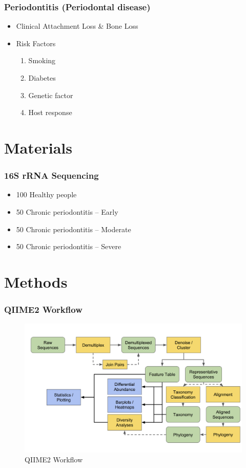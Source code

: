 \documentclass{beamer}
\begin{document}
    \begin{frame}
        \frametitle{Periodontitis (Periodontal disease)}

        \begin{itemize}
            \item Clinical Attachment Loss \& Bone Loss \cite{periodontitis1}
            \item Risk Factors \cite{periodontitis2}
            \begin{enumerate}
                \item Smoking
                \item Diabetes
                \item Genetic factor
                \item Host response
            \end{enumerate}
        \end{itemize}
    \end{frame}

    \section{Materials}
    \begin{frame}
        \frametitle{16S rRNA Sequencing}

        \begin{itemize}
            \item 100 Healthy people
            \item 50 Chronic periodontitis -- Early
            \item 50 Chronic periodontitis -- Moderate
            \item 50 Chronic periodontitis -- Severe
        \end{itemize}
    \end{frame}

    \section{Methods}
    \begin{frame}
        \frametitle{QIIME2 Workflow}

        \begin{figure}
            \centering
            \includegraphics[width=0.7 \linewidth]{figures/qiime.png}
            \caption{QIIME2 Workflow \protect\cite{qiime1, qiime2}}
            \label{fig:qiime}
        \end{figure}
    \end{frame}
\end{document}

